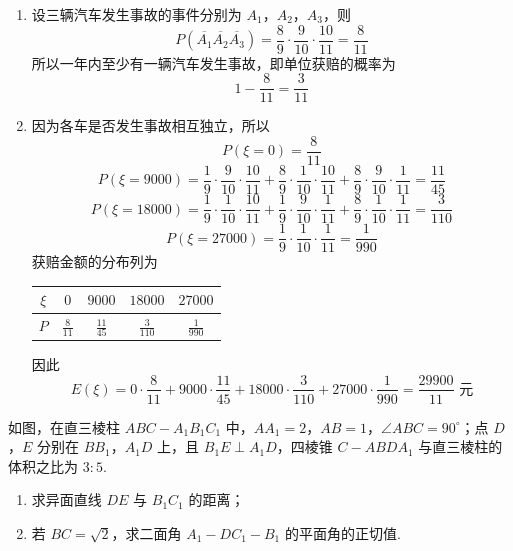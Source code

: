 \begin{solution}
\begin{enumerate}
\item 设三辆汽车发生事故的事件分别为 \(A_1\)，\(A_2\)，\(A_3\)，则
\[
P(\overline{A_1}\overline{A_2}\overline{A_3})
=\frac{8}{9}\cdot\frac{9}{10}\cdot\frac{10}{11}
=\frac{8}{11}
\]
所以一年内至少有一辆汽车发生事故，即单位获赔的概率为
\[
1-\frac{8}{11}=\frac{3}{11}
\]
\item 因为各车是否发生事故相互独立，所以
\[
P(\xi=0)=\frac{8}{11}
\]
\[
P(\xi=9000)
=\frac{1}{9}\cdot\frac{9}{10}\cdot\frac{10}{11}
 +\frac{8}{9}\cdot\frac{1}{10}\cdot\frac{10}{11}
 +\frac{8}{9}\cdot\frac{9}{10}\cdot\frac{1}{11}
=\frac{11}{45}
\]
\[
P(\xi=18000)
=\frac{1}{9}\cdot\frac{1}{10}\cdot\frac{10}{11}
 +\frac{1}{9}\cdot\frac{9}{10}\cdot\frac{1}{11}
 +\frac{8}{9}\cdot\frac{1}{10}\cdot\frac{1}{11}
=\frac{3}{110}
\]
\[
P(\xi=27000)
=\frac{1}{9}\cdot\frac{1}{10}\cdot\frac{1}{11}
=\frac{1}{990}
\]
获赔金额的分布列为
\begin{center}
\begin{tabular}{c|cccc}
\(\xi\) & \(0\) & \(9000\) & \(18000\) & \(27000\) \\
\hline
\(P\) & \(\frac{8}{11}\) & \(\frac{11}{45}\) & \(\frac{3}{110}\) & \(\frac{1}{990}\)
\end{tabular}
\end{center}
因此
\[
E(\xi)=0\cdot\frac{8}{11}
 +9000\cdot\frac{11}{45}
 +18000\cdot\frac{3}{110}
 +27000\cdot\frac{1}{990}
=\frac{29900}{11}\text{ 元}
\]
\end{enumerate}
\end{solution}

\begin{problem}
如图，在直三棱柱 \(ABC - A_{1}B_{1}C_{1}\) 中，\(AA_{1} = 2\)，\(AB = 1\)，\(\angle ABC = 90^{\circ}\)；点 \(D\)，\(E\) 分别在 \(BB_{1}\)，\(A_{1}D\) 上，且 \(B_{1}E \perp A_{1}D\)，四棱锥 \(C - ABDA_{1}\) 与直三棱柱的体积之比为 \(3:5\).

\begin{enumerate}
\item 求异面直线 \(DE\) 与 \(B_{1}C_{1}\) 的距离；
\item 若 \(BC = \sqrt{2}\)，求二面角 \(A_{1} - DC_{1} - B_{1}\) 的平面角的正切值.
\end{enumerate}
\end{problem}

